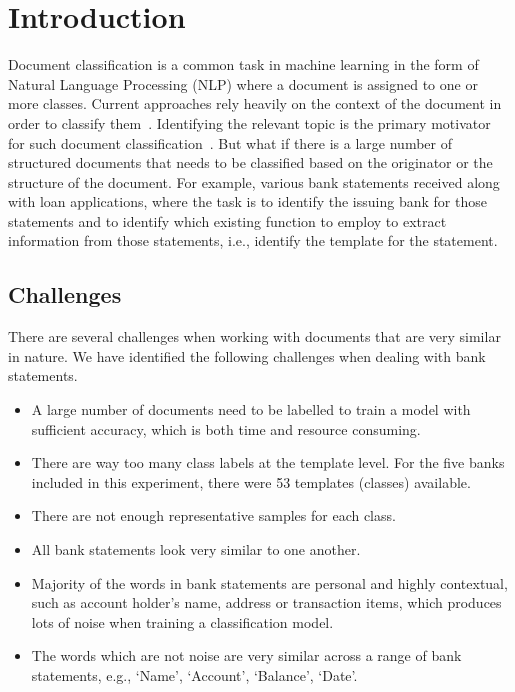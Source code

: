 \documentclass[runningheads]{llncs}
\begin{document}
\section{Introduction}
Document classification is a common task in machine learning in the form of Natural Language Processing (NLP) where a document is assigned to one or more classes. Current approaches rely heavily on the context of the document in order to classify them~\cite{jones1972,power2010}. Identifying the relevant topic is the primary motivator for such document classification~\cite{hassan2017,kotenko2015,lin2006}. But what if there is a large number of structured documents that needs to be classified based on the originator or the structure of the document. For example, various bank statements received along with loan applications, where the task is to identify the issuing bank for those statements and to identify which existing function to employ to extract information from those statements, i.e., identify the template for the statement.

\subsection{Challenges}
There are several challenges when working with documents that are very similar in nature. We have identified the following challenges when dealing with bank statements.

\begin{itemize}
\item A large number of documents need to be labelled to train a model with sufficient accuracy, which is both time and resource consuming.
\item There are way too many class labels at the template level. For the five banks included in this experiment, there were 53 templates (classes) available.
\item There are not enough representative samples for each class.
\item All bank statements look very similar to one another.
\item Majority of the words in bank statements are personal and highly contextual, such as account holder's name, address or transaction items, which produces lots of noise when training a classification model.
\item The words which are not noise are very similar across a range of bank statements, e.g., ‘Name’, ‘Account’, ‘Balance’, ‘Date’.
\end{itemize}
\end{document}
